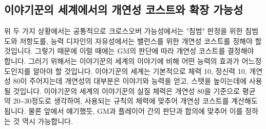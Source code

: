 \documentclass{report}
\begin{document}
	\subsection*{이야기꾼의 세계에서의 개연성 코스트와 확장 가능성}
	위 두 가지 상황에서는 공통적으로 크로스오버 가능성에서는 "침범" 판정을 위한 침범도와 저항도를, 능력 디자인의 자유성에서는 밸런스를 위한 개연성 코스트를 정해야 할 것입니다. 그렇기 때문에 이럴 때에는 GM의 판단에 따라 개연성 코스트를 결정해야 합니다. 그러기 위해서는 이야기꾼의 세계의 이야기에 비해 어떤 능력의 효과가 어느정도인지를 알아야 할 것입니다. 이야기꾼의 세계는 기본적으로 체력 10, 정신력 10, 개연성 80이 주어지는데 개연성의 대부분은 이야기와 능력을 얻고, 스탯을 높이는데에 사용될 것입니다. 이야기꾼의 세계의 이야기꾼의 실질 체력은 개연성 80을 기준으로 평균 약 20\textasciitilde30정도로 생각하여, 사용되는 규칙의 체력에 맞추어 개연성 코스트를 계산해도 됩니다. 물론 앞에서 얘기했듯, GM과 플레이어 간의 판단과 합의에 맞추어 이를 정하는 것 역시 가능합니다.
\end{document}
